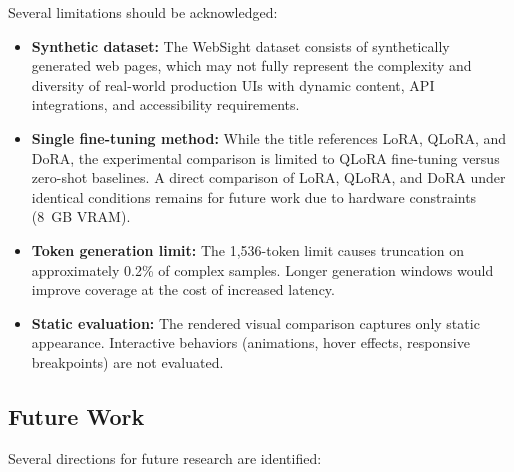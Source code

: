 Several limitations should be acknowledged:

\begin{itemize}
    \item \textbf{Synthetic dataset:} The WebSight dataset consists of synthetically generated web pages, which may not fully represent the complexity and diversity of real-world production UIs with dynamic content, API integrations, and accessibility requirements.
    
    \item \textbf{Single fine-tuning method:} While the title references LoRA, QLoRA, and DoRA, the experimental comparison is limited to QLoRA fine-tuning versus zero-shot baselines. A direct comparison of LoRA, QLoRA, and DoRA under identical conditions remains for future work due to hardware constraints (8~GB VRAM).
    
    \item \textbf{Token generation limit:} The 1,536-token limit causes truncation on approximately 0.2\% of complex samples. Longer generation windows would improve coverage at the cost of increased latency.
    
    \item \textbf{Static evaluation:} The rendered visual comparison captures only static appearance. Interactive behaviors (animations, hover effects, responsive breakpoints) are not evaluated.
\end{itemize}

\subsection{Future Work}

Several directions for future research are identified:

